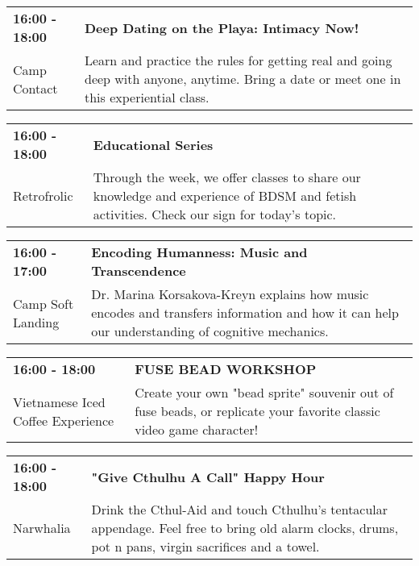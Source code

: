 \begin{tabular}{ p{1in} p{2.2in} }
    \textbf{16:00 - 18:00} & \textbf{Deep Dating on the Playa: Intimacy Now!} \\
    Camp Contact \newline  & Learn and practice the rules for getting real and going deep with anyone, anytime. Bring a date or meet one in this experiential class. \\
    \hline 
\end{tabular}
    
\begin{tabular}{ p{1in} p{2.2in} }
    \textbf{16:00 - 18:00} & \textbf{Educational Series} \\
    Retrofrolic \newline  & Through the week, we offer classes to share our knowledge and experience of BDSM and fetish activities.  Check our sign for today's topic. \\
    \hline 
\end{tabular}
    
\begin{tabular}{ p{1in} p{2.2in} }
    \textbf{16:00 - 17:00} & \textbf{Encoding Humanness: Music and Transcendence} \\
    Camp Soft Landing \newline  & Dr. Marina Korsakova-Kreyn explains how music encodes and transfers information and how it can help our understanding of cognitive mechanics. \\
    \hline 
\end{tabular}
    
\begin{tabular}{ p{1in} p{2.2in} }
    \textbf{16:00 - 18:00} & \textbf{FUSE BEAD WORKSHOP} \\
    Vietnamese Iced Coffee Experience \newline  & Create your own "bead sprite" souvenir out of fuse beads, or replicate your favorite classic video game character! \\
    \hline 
\end{tabular}
    
\begin{tabular}{ p{1in} p{2.2in} }
    \textbf{16:00 - 18:00} & \textbf{"Give Cthulhu A Call" Happy Hour} \\
    Narwhalia \newline  & Drink the Cthul-Aid and touch Cthulhu's tentacular appendage. Feel free to bring old alarm clocks, drums, pot n pans, virgin sacrifices and a towel. \\
    \hline 
\end{tabular}
    
